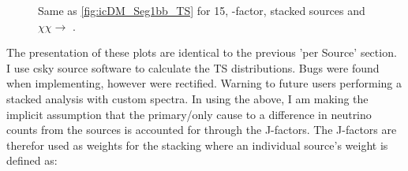\begin{figure}[t]
    \caption{Same as \cref{fig:icDM_Seg1bb_TS} for 15, \GS \J-factor, stacked sources and $\chi\chi \rightarrow$ \parpar{\nu_\mu}.}
    \label{fig:icDM_stact_numu_TS}
\end{figure}

The presentation of these plots are identical to the previous 'per Source' section. I use csky source software to calculate the TS distributions.
Bugs were found when implementing, however were rectified. Warning to future users performing a stacked analysis with custom spectra.
In using the above, I am making the implicit assumption that the primary/only cause to a difference in neutrino counts from the sources is accounted for through the J-factors.
The J-factors are therefor used as weights for the stacking where an individual source's weight is defined as:

